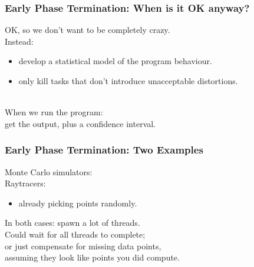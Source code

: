 \documentclass[aspectratio=43]{beamer}
\newenvironment{changemargin}[1]{%
  \begin{list}{}{%
    \setlength{\topsep}{0pt}%
    \setlength{\leftmargin}{#1}%
    \setlength{\rightmargin}{1em}
    \setlength{\listparindent}{\parindent}%
    \setlength{\itemindent}{\parindent}%
    \setlength{\parsep}{\parskip}%
  }%
  \item[]}{\end{list}}
\begin{document}
\begin{frame}
  \frametitle{Early Phase Termination: When is it OK anyway?}

\begin{changemargin}{2cm}
OK, so we don't want to be completely crazy.\\[1em]

Instead: 
\begin{itemize}
\item develop a statistical model of the program behaviour.
\item only kill tasks that don't introduce unacceptable distortions.
\end{itemize}

~\\[1em]

When we run the program: \\ \qquad get the output, plus a confidence interval.


\end{changemargin}
\end{frame}

\begin{frame}
  \frametitle{Early Phase Termination: Two Examples}

\begin{changemargin}{2cm}

Monte Carlo simulators: \\
Raytracers:
\begin{itemize}
\item already picking points randomly.
\end{itemize}

In both cases: spawn a lot of threads.\\[1em]
Could wait for all threads to complete;\\
or just compensate for missing data points,\\
assuming they look like points you did compute.

\end{changemargin}
\end{frame}
\end{document}
